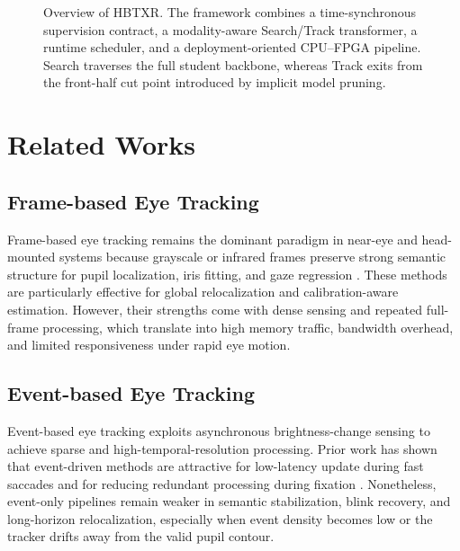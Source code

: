 \documentclass[journal]{IEEEtran}
\begin{document}
\begin{figure}[t]
\caption{Overview of HBTXR. The framework combines a time-synchronous supervision contract, a modality-aware Search/Track transformer, a runtime scheduler, and a deployment-oriented CPU--FPGA pipeline. Search traverses the full student backbone, whereas Track exits from the front-half cut point introduced by implicit model pruning.}
\label{fig:overview}
\end{figure}


\section{Related Works}
\subsection{Frame-based Eye Tracking}
Frame-based eye tracking remains the dominant paradigm in near-eye and head-mounted systems because grayscale or infrared frames preserve strong semantic structure for pupil localization, iris fitting, and gaze regression \cite{ref1,ref3}. These methods are particularly effective for global relocalization and calibration-aware estimation. However, their strengths come with dense sensing and repeated full-frame processing, which translate into high memory traffic, bandwidth overhead, and limited responsiveness under rapid eye motion.

\subsection{Event-based Eye Tracking}
Event-based eye tracking exploits asynchronous brightness-change sensing to achieve sparse and high-temporal-resolution processing. Prior work has shown that event-driven methods are attractive for low-latency update during fast saccades and for reducing redundant processing during fixation \cite{ref4,ref5,ref6}. Nonetheless, event-only pipelines remain weaker in semantic stabilization, blink recovery, and long-horizon relocalization, especially when event density becomes low or the tracker drifts away from the valid pupil contour.
\end{document}
